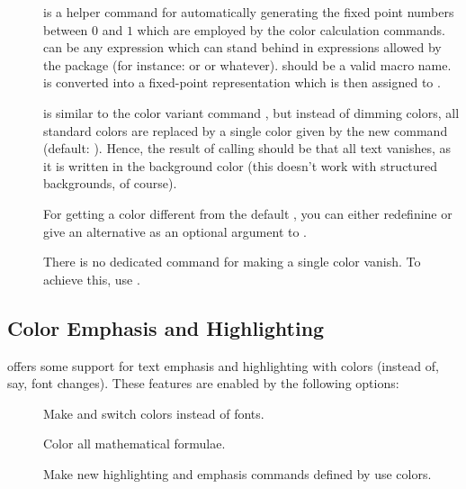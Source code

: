 \documentclass[12pt]{scrartcl}
\let\newslide=\relax
\begin{document}
\begin{description}
  \item[]
     is a helper command for automatically
    generating the fixed point numbers between $0$ and $1$ which are employed by the color calculation commands.
     can be any expression which can stand behind \code{*} in expressions allowed by the
    \href{ftp://ftp.dante.de/tex-archive/help/Catalogue/entries/calc.html}{} package (for instance:
     or  or whatever).
     should be a valid macro name.  is converted into a fixed-point representation which is
    then assigned to .

    \newslide

  \item[]
     is similar to the color variant command
    , but instead of dimming colors, all standard colors are replaced by a single color given by
    the new command  (default: ). Hence, the result of calling
     should be that all text vanishes, as it is written in the background color (this doesn't
    work with structured backgrounds, of course).

    For getting a color different from the default , you can either redefinine 
    or give an alternative  as an optional argument to .

    There is no dedicated command for making a single color vanish. To achieve this, use
    .
  \end{description}


  \subsection{Color Emphasis and Highlighting}\label{Sec:ColorOptions}
   offers some support for text emphasis and highlighting with colors (instead of, say, font
  changes). These features are enabled by the following options:
  \begin{description}
  \item[]
    Make  and  switch colors instead of fonts.

  \item[]
    Color all mathematical formulae.

  \item[]
    Make new highlighting and emphasis commands defined by 
    use colors.
  \end{description}
\end{document}

